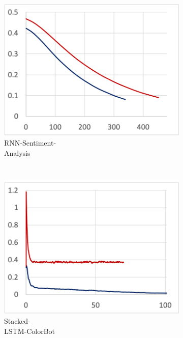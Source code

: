 \begin{figure}[!ht]
  \begin{subfigure}[t]{.22\textwidth}
    \includegraphics[width=\textwidth]{tf2-09}
    \caption{\small RNN-Sentiment-\\Analysis}
  \end{subfigure} 
  ~
  \begin{subfigure}[t]{.22\textwidth}
    \includegraphics[width=\textwidth]{tf2-10}
    \caption{\small Stacked-\\LSTM-ColorBot}
  \end{subfigure}
  ~
  \begin{subfigure}[t]{.22\textwidth}

\end{subfigure}
\end{figure}
